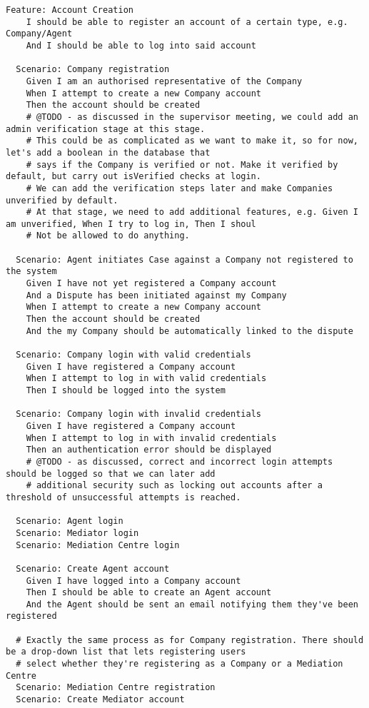 \begin{lstlisting}
Feature: Account Creation
    I should be able to register an account of a certain type, e.g. Company/Agent
    And I should be able to log into said account

  Scenario: Company registration
    Given I am an authorised representative of the Company
    When I attempt to create a new Company account
    Then the account should be created
    # @TODO - as discussed in the supervisor meeting, we could add an admin verification stage at this stage.
    # This could be as complicated as we want to make it, so for now, let's add a boolean in the database that
    # says if the Company is verified or not. Make it verified by default, but carry out isVerified checks at login.
    # We can add the verification steps later and make Companies unverified by default.
    # At that stage, we need to add additional features, e.g. Given I am unverified, When I try to log in, Then I shoul
    # Not be allowed to do anything.

  Scenario: Agent initiates Case against a Company not registered to the system
    Given I have not yet registered a Company account
    And a Dispute has been initiated against my Company
    When I attempt to create a new Company account
    Then the account should be created
    And the my Company should be automatically linked to the dispute

  Scenario: Company login with valid credentials
    Given I have registered a Company account
    When I attempt to log in with valid credentials
    Then I should be logged into the system

  Scenario: Company login with invalid credentials
    Given I have registered a Company account
    When I attempt to log in with invalid credentials
    Then an authentication error should be displayed
    # @TODO - as discussed, correct and incorrect login attempts should be logged so that we can later add
    # additional security such as locking out accounts after a threshold of unsuccessful attempts is reached.

  Scenario: Agent login
  Scenario: Mediator login
  Scenario: Mediation Centre login

  Scenario: Create Agent account
    Given I have logged into a Company account
    Then I should be able to create an Agent account
    And the Agent should be sent an email notifying them they've been registered

  # Exactly the same process as for Company registration. There should be a drop-down list that lets registering users
  # select whether they're registering as a Company or a Mediation Centre
  Scenario: Mediation Centre registration
  Scenario: Create Mediator account
\end{lstlisting}


